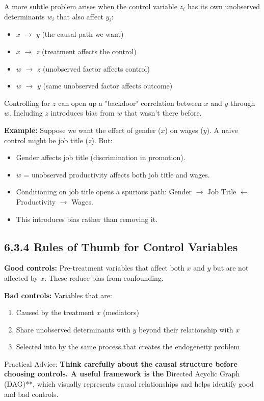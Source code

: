 A more subtle problem arises when the control variable $z_i$ has its own unobserved determinants $w_i$ that also affect $y_i$:

\begin{itemize}
\item $x$ $\to$ $y$ (the causal path we want)
\item $x$ $\to$ $z$ (treatment affects the control)
\item $w$ $\to$ $z$ (unobserved factor affects control)
\item $w$ $\to$ $y$ (same unobserved factor affects outcome)
\end{itemize}

Controlling for $z$ can open up a "backdoor" correlation between $x$ and $y$ through $w$. Including $z$ introduces bias from $w$ that wasn't there before.

\textbf{Example:} Suppose we want the effect of gender ($x$) on wages ($y$). A naive control might be job title ($z$). But:
\begin{itemize}
\item Gender affects job title (discrimination in promotion).
\item $w$ = unobserved productivity affects both job title and wages.
\item Conditioning on job title opens a spurious path: Gender $\to$ Job Title $\leftarrow$ Productivity $\to$ Wages.
\item This introduces bias rather than removing it.
\end{itemize}

\subsection{6.3.4 Rules of Thumb for Control Variables}

\textbf{Good controls:} Pre-treatment variables that affect both $x$ and $y$ but are not affected by $x$. These reduce bias from confounding.

\textbf{Bad controls:} Variables that are:
\begin{enumerate}
\item Caused by the treatment $x$ (mediators)
\item Share unobserved determinants with $y$ beyond their relationship with $x$
\item Selected into by the same process that creates the endogeneity problem
\end{enumerate}

\begin{keybox}{Practical Advice:\textbf{ Think carefully about the causal structure before choosing controls. A useful framework is the }Directed Acyclic Graph (DAG)**, which visually represents causal relationships and helps identify good and bad controls.}
\end{keybox}

